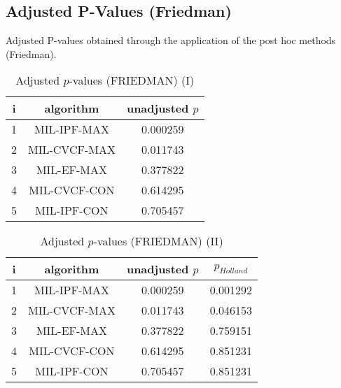 \documentclass[a4paper,10pt]{article}
\begin{document}
\begin{landscape}
\newpage

\section{Adjusted P-Values (Friedman)}


Adjusted P-values obtained through the application of the post hoc methods (Friedman).

\begin{table}[!htp]
\centering\small
\begin{tabular}{ccc}
i&algorithm&unadjusted $p$\\
\hline1&MIL-IPF-MAX&0.000259\\2&MIL-CVCF-MAX&0.011743\\3&MIL-EF-MAX&0.377822\\4&MIL-CVCF-CON&0.614295\\5&MIL-IPF-CON&0.705457\\\hline
\end{tabular}
\caption{Adjusted $p$-values (FRIEDMAN) (I)}
\end{table}
\begin{table}[!htp]
\centering\small
\begin{tabular}{cccc}
i&algorithm&unadjusted $p$&$p_{Holland}$\\
\hline1&MIL-IPF-MAX&0.000259&0.001292\\2&MIL-CVCF-MAX&0.011743&0.046153\\3&MIL-EF-MAX&0.377822&0.759151\\4&MIL-CVCF-CON&0.614295&0.851231\\5&MIL-IPF-CON&0.705457&0.851231\\\hline
\end{tabular}
\caption{Adjusted $p$-values (FRIEDMAN) (II)}
\end{table}

\newpage
\end{landscape}
\end{document}

